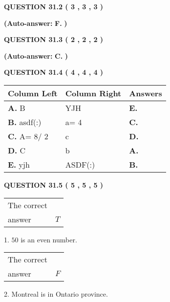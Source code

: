\documentclass[12pt]{article}
\begin{document}
  
  
{\textbf{\large{QUESTION
31.2 
 (           3 ,           3 ,           3 )
}}}
 
 
{\textbf{(Auto-answer:}}
{\textbf{\large{
F.}}}
{\textbf{)}}
 
 
  
  
{\textbf{\large{QUESTION
31.3 
 (           2 ,           2 ,           2 )
}}}
 
 
{\textbf{(Auto-answer:}}
{\textbf{\large{
C.}}}
{\textbf{)}}
 
 
  
  
{\textbf{\large{QUESTION
31.4 
 (           4 ,           4 ,           4 )
}}}
 
 
\noindent{}
  
  
\begin{tabular}{|l|l|l|}
 \hline
 Column Left & Column Right  & Answers       \\ 
 \hline
{\textbf{\large{
A.}}}
B
  & 
YJH
 & 
{\textbf{\large{
E.}}}
 \\ 
 \hline
{\textbf{\large{
B.}}}
asdf(:)
  & 
 a= %
4
 & 
{\textbf{\large{
C.}}}
 \\ 
 \hline
{\textbf{\large{
C.}}}
 A= %
8/ %
2

  & 
c
 & 
{\textbf{\large{
D.}}}
 \\ 
 \hline
{\textbf{\large{
D.}}}
C
  & 
b
 & 
{\textbf{\large{
A.}}}
 \\ 
 \hline
{\textbf{\large{
E.}}}
yjh
  & 
ASDF(:)
 & 
{\textbf{\large{
B.}}}
 \\ 
 \hline
 \end{tabular}
  
  
\noindent{}
 
 
  
  
{\textbf{\large{QUESTION
31.5 
 (           5 ,           5 ,           5 )
}}}

 
\noindent\begin{tabular}{|l|l|}\hline The correct & \\
          answer &  %
$T$ \\ \hline \end{tabular}
1. $ %
50$ is an  %
even number.
 
\noindent\begin{tabular}{|l|l|}\hline The correct & \\
          answer &  %
$F$ \\ \hline \end{tabular}
2.  %
Montreal is in  %
Ontario province.
 
\end{document}
